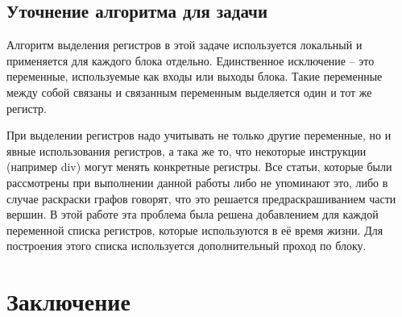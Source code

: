 \documentclass[a4paper,14pt]{extarticle}
\begin{document}

\subsection{Уточнение алгоритма для задачи}

Алгоритм выделения регистров в этой задаче используется локальный и применяется для каждого блока отдельно.
Единственное исключение -- это переменные, используемые как входы или выходы блока.
Такие переменные между собой связаны и связанным переменным выделяется один и тот же регистр.

При выделении регистров надо учитывать не только другие переменные, но и явные использования регистров, а така же то, что некоторые инструкции (например div) могут менять конкретные регистры.
Все статьи, которые были рассмотрены при выполнении данной работы либо не упоминают это, либо в случае раскраски графов говорят, что это решается предраскрашиванием части вершин.
В этой работе эта проблема была решена добавлением для каждой переменной списка регистров, которые используются в её время жизни.
Для построения этого списка используется дополнительный проход по блоку.



\section{Заключение}

\newpage



\end{document}

